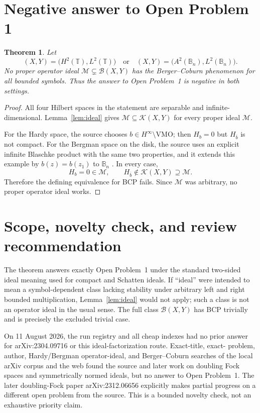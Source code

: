 \documentclass[11pt]{article}
\newtheorem{theorem}{Theorem}
\newcommand{\Bop}{\mathcal B}
\newcommand{\Kop}{\mathcal K}
\begin{document}
\section{Negative answer to Open Problem 1}

\begin{theorem}\label{thm:main}
Let
\[
 (X,Y)=\bigl(H^2(\mathbb T),L^2(\mathbb T)\bigr)
 \quad\text{or}\quad
 (X,Y)=\bigl(A^2(\mathbb B_n),L^2(\mathbb B_n)\bigr).
\]
No proper operator ideal $\mathcal M\subsetneq\Bop(X,Y)$ has the
Berger--Coburn phenomenon for all bounded symbols.  Thus the answer to
Open Problem~1 is negative in both settings.
\end{theorem}

\begin{proof}
All four Hilbert spaces in the statement are separable and
infinite-dimensional.  Lemma~\ref{lem:ideal} gives
$\mathcal M\subseteq\Kop(X,Y)$ for every proper ideal $\mathcal M$.

For the Hardy space, the source chooses
$b\in H^\infty\setminus\mathrm{VMO}$; then $H_b=0$ but
$H_{\bar b}$ is not compact.  For the Bergman space on the disk, the source
uses an explicit infinite Blaschke product with the same two properties, and
it extends this example by $b(z)=b(z_1)$ to $\mathbb B_n$
\cite[Example~2]{source}.  In every case,
\[
 H_b=0\in\mathcal M,
 \qquad
 H_{\bar b}\notin\Kop(X,Y)\supseteq\mathcal M.
\]
Therefore the defining equivalence for BCP fails.  Since $\mathcal M$ was
arbitrary, no proper operator ideal works.
\end{proof}

\section{Scope, novelty check, and review recommendation}

The theorem answers exactly Open Problem~1 under the standard two-sided ideal
meaning used for compact and Schatten ideals.  If ``ideal'' were intended to
mean a symbol-dependent class lacking stability under arbitrary left and right
bounded multiplication, Lemma~\ref{lem:ideal} would not apply; such a class is
not an operator ideal in the usual sense.  The full class $\Bop(X,Y)$ has BCP
trivially and is precisely the excluded trivial case.

On 11 August 2026, the run registry and all cheap indexes had no prior answer
for arXiv:2304.09716 or this ideal-factorization route.  Exact-title, exact-
problem, author, Hardy/Bergman operator-ideal, and Berger--Coburn searches of
the local arXiv corpus and the web found the source and later work on doubling
Fock spaces and symmetrically normed ideals, but no answer to Open Problem~1.
The later doubling-Fock paper arXiv:2312.06656 explicitly makes partial
progress on a different open problem from the source.  This is a bounded
novelty check, not an exhaustive priority claim.
\end{document}
